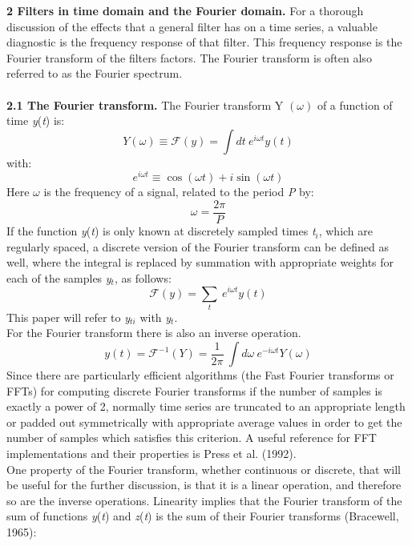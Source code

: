 \documentclass{article}
\begin{document}
\textbf{2 Filters in time domain and the Fourier domain.}
For a thorough discussion of the effects that a general filter has on a time series, a valuable diagnostic is the frequency response of that filter. This frequency response is the Fourier transform of the filters factors. The Fourier transform is often also referred to as the Fourier spectrum.\\ 
\bigskip\\
\textbf{\small 2.1 The Fourier transform.}
The Fourier transform Y $(\omega)$ of a function of time \textit{y}(\textit{t}) is:
\begin{equation}
Y (\omega)\equiv \mathcal{F} (\textit{y})= \int dt \ e^{i \omega t} y(\textit{t})
\end{equation}
with:
\begin{equation*}
e^{i \omega t} \equiv \cos(\omega t) + i \sin(\omega t)
\end{equation*}
Here $\omega$ is the frequency of a signal, related to the period \textit{P} by:
\begin{equation}
\omega = \frac {2\pi}{P}
\end{equation}
If the function \textit{y}(\textit{t}) is only known at discretely sampled times \textit{t$_i$}, which are regularly spaced, a discrete version of the Fourier transform can be defined as well, where the integral is replaced by summation with appropriate weights for each of the samples \textit{y$_t$}, as follows:
\begin{equation}
\mathcal{F}(y) = \sum_t  \ e^{i \omega t} y(\textit{t})
\end{equation}
This paper will refer to \textit{y$_{ti}$} with \textit{y$_t$}.\\
For the Fourier transform there is also an inverse operation.
\begin{equation}
y(\textit{t}) = \mathcal{F}^{-1} (Y) = \frac {1}{2 \pi} \ \int d\omega \ e^{-i \omega t} Y(\omega)
\end{equation}
Since there are particularly efficient algorithms (the Fast Fourier transforms or FFTs) for computing discrete Fourier transforms if the number of samples is exactly a power of 2, normally time series are truncated to an appropriate length or padded out symmetrically with appropriate average values in order to get the number of samples which satisfies this criterion. A useful reference for FFT implementations and their properties is Press et al. (1992).\\One property of the Fourier transform, whether continuous or discrete, that will be useful for the further discussion, is that it is a linear operation, and therefore so are the inverse operations. Linearity implies that the Fourier transform of the sum of functions \textit{y}(\textit{t}) and \textit{z}(\textit{t}) is the sum of their Fourier transforms (Bracewell, 1965):
\end{document}
